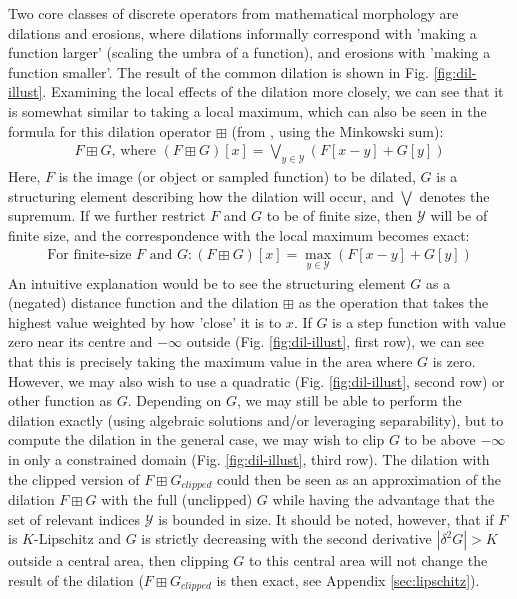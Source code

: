 \documentclass[a4paper, 12pt]{report}
\begin{document}
Two core classes of discrete operators from mathematical morphology are dilations and erosions, where dilations informally correspond with 'making a function larger' (scaling the umbra of a function), and erosions with 'making a function smaller'. The result of the common dilation is shown in Fig. \ref{fig:dil-illust}. Examining the local effects of the dilation more closely, we can see that it is somewhat similar to taking a local maximum, which can also be seen in the formula for this dilation operator $\boxplus$  (from \cite{heijmans1996morphological}, using the Minkowski sum): 
\begin{align}
F \boxplus G \textrm{, where }(F \boxplus G)[x] = \bigvee_ {y\in\mathcal{Y}} \left(F[x-y] + G[y]\right)	
\end{align}
\noindent
Here, $F$ is the image (or object or sampled function) to be dilated, $G$ is a structuring element describing how the dilation will occur, and $\bigvee$ denotes the supremum. If we further restrict $F$ and $G$ to be of finite size, then $\mathcal{Y}$ will be of finite size, and the correspondence with the local maximum becomes exact:
\begin{align}
\textrm{For finite-size }F\textrm{ and }G: (F \boxplus G)[x] = \max_ {y\in\mathcal{Y}} \left(F[x-y] + G[y]\right)	
\end{align}
 An intuitive explanation would be to see the structuring element $G$ as a (negated) distance function and the dilation $\boxplus$ as the operation that takes the highest value weighted by how 'close' it is to $x$. If $G$ is a step function with value zero near its centre and $-\infty$ outside (Fig. \ref{fig:dil-illust}, first row), we can see that this is precisely taking the maximum value in the area where $G$ is zero. However, we may also wish to use a quadratic (Fig. \ref{fig:dil-illust}, second row) or other function as $G$. Depending on $G$, we may still be able to perform the dilation exactly (using algebraic solutions and/or leveraging separability), but to compute the dilation in the general case, we may wish to clip $G$ to be above $-\infty$ in only a constrained domain (Fig. \ref{fig:dil-illust}, third row). The dilation with the clipped version of $F\boxplus G_{clipped}$ could then be seen as an approximation of the dilation $F\boxplus G$ with the full (unclipped) $G$ while having the advantage that the set of relevant indices $\mathcal{Y}$ is bounded in size. It should be noted, however, that if $F$ is $K$-Lipschitz and $G$ is strictly decreasing with the second derivative $|\delta^2 G|>K$ outside a central area, then clipping $G$ to this central area will not change the result of the dilation ($F\boxplus G_{clipped}$ is then exact, see Appendix \ref{sec:lipschitz}).
\end{document}
